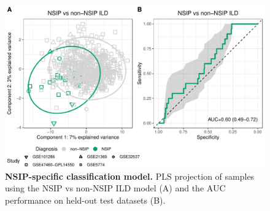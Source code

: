 \documentclass[
]{article}
\begin{document}
\pagebreak

\newpage



\begin{figure}

{\centering \includegraphics[width=0.9\linewidth,]{./Figures/SysReview/FigE5_NSIP} 

}

\caption[NSIP-specific classification model]{\textbf{NSIP-specific classification model.} PLS projection of samples using the NSIP vs non-NSIP ILD model (A) and the AUC performance on held-out test datasets (B).}\label{fig:nsipmodel}
\end{figure}
\end{document}
